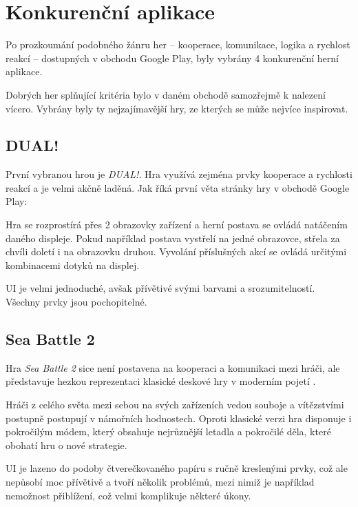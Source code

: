 \chapter{Konkurenční aplikace}

Po prozkoumání podobného žánru her – kooperace, komunikace, logika a rychlost reakcí – dostupných v obchodu Google Play, byly vybrány 4 konkurenční herní aplikace.

Dobrých her splňující kritéria bylo v daném obchodě samozřejmě k nalezení vícero. Vybrány byly ty nejzajímavější hry, ze kterých se může \emph{\appName{}} nejvíce inspirovat.

\section{DUAL!}

První vybranou hrou je \emph{DUAL!}. Hra využívá zejména prvky kooperace a rychlosti reakcí a je velmi akčně laděná. Jak říká první věta stránky hry \cite{seabaa_dual} v obchodě Google Play: 

Hra se rozprostírá přes 2 obrazovky zařízení a herní postava se ovládá natáčením daného displeje. Pokud například postava vystřelí na jedné obrazovce, střela za chvíli doletí i na obrazovku druhou. Vyvolání příslušných akcí se ovládá určitými kombinacemi dotyků na displej.

UI je velmi jednoduché, avšak přívětivé svými barvami a srozumitelností. Všechny prvky jsou pochopitelné.

\section{Sea Battle 2}

Hra \emph{Sea Battle 2} sice není postavena na kooperaci a komunikaci mezi hráči, ale představuje hezkou reprezentaci klasické deskové hry v moderním pojetí \cite{henrysmithinc_spaceteam}.

Hráči z celého světa mezi sebou na svých zařízeních vedou souboje a vítězstvími postupně postupují v námořních hodnostech. Oproti klasické verzi hra disponuje i pokročilým módem, který obsahuje nejrůznější letadla a pokročilé děla, které obohatí hru o nové strategie.

UI je lazeno do podoby čtverečkovaného papíru s ručně kreslenými prvky, což ale nepůsobí moc přívětivě a tvoří několik problémů, mezi nimiž je například nemožnost přiblížení, což velmi komplikuje některé úkony. 

